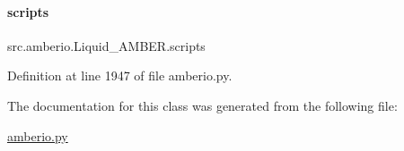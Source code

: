 \paragraph{\texorpdfstring{scripts}{scripts}}
{\footnotesize\ttfamily src.\+amberio.\+Liquid\+\_\+\+A\+M\+B\+E\+R.\+scripts}



Definition at line 1947 of file amberio.\+py.



The documentation for this class was generated from the following file\+:\begin{DoxyCompactItemize}
\item 
\hyperlink{amberio_8py}{amberio.\+py}\end{DoxyCompactItemize}
